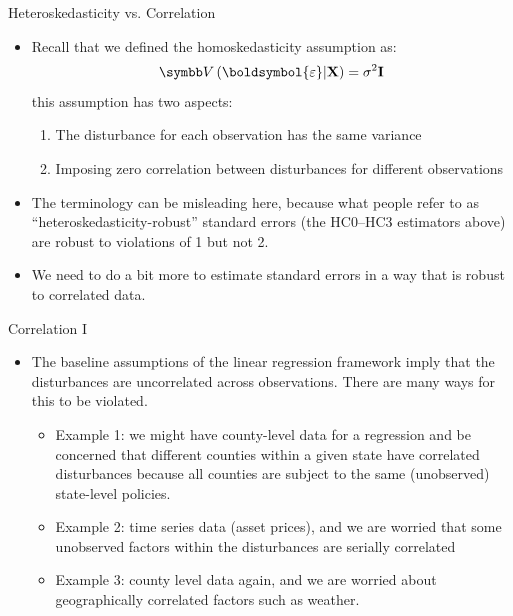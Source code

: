 \documentclass[aspectratio=169,11pt]{beamer}
\begin{document}
\begin{frame}{Heteroskedasticity vs. Correlation}
\begin{itemize}
	\item Recall that we defined the homoskedasticity assumption as:\[
	\Var\left(\boldsymbol{\varepsilon} | {\bf X}\right) =\sigma^2 {\bf I}
	\]
	this assumption has two aspects:
	\begin{enumerate}
		\item The disturbance for each observation has the same variance
		\item Imposing zero correlation between disturbances for different observations
	\end{enumerate}

	\item The terminology can be misleading here, because what people refer to as ``heteroskedasticity-robust''
	standard errors (the HC0--HC3 estimators above) are robust to violations of 1 but not 2. 

	\item We need to do a bit more to estimate standard errors in a way that is robust to correlated data. 

\end{itemize}
\end{frame}


\begin{frame}{Correlation I}
\begin{itemize}
	\item The baseline assumptions of the linear regression framework imply that
	the disturbances are uncorrelated across observations.  There are many ways for this to be violated. 
	\begin{itemize}
		\item Example 1: we might have county-level data for a regression and be concerned
		that different counties within a given state have correlated disturbances because
		all counties are subject to the same (unobserved) state-level policies.
		\item Example 2: time series data (asset prices), and we are worried that some unobserved
		factors within the disturbances are serially correlated
		\item Example 3: county level data again, and we are worried about geographically
		correlated factors such as weather. 
	\end{itemize}
\end{itemize}
\end{frame}
\end{document}
